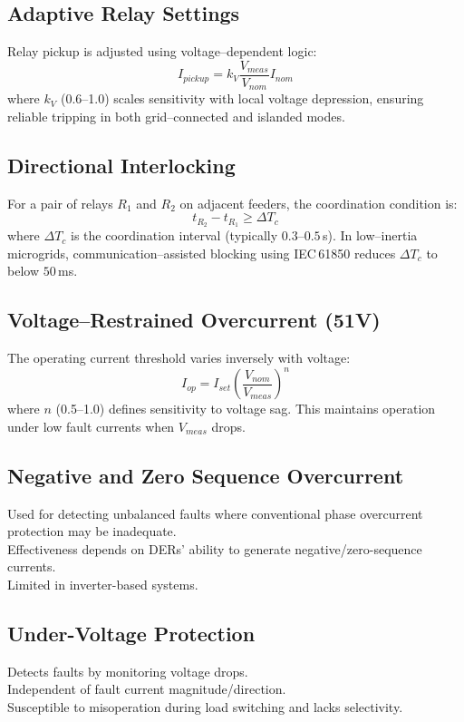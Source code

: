 \subsection{Adaptive Relay Settings}
Relay pickup is adjusted using voltage–dependent logic:
\begin{equation}
I_{pickup} = k_V \frac{V_{meas}}{V_{nom}} I_{nom}
\label{eq:adaptive}
\end{equation}
where $k_V$ (0.6–1.0) scales sensitivity with local voltage depression, ensuring reliable tripping in both grid–connected and islanded modes.

\subsection{Directional Interlocking}
For a pair of relays $R_1$ and $R_2$ on adjacent feeders, the coordination condition is:
\begin{equation}
t_{R_2} - t_{R_1} \ge \Delta T_c
\label{eq:coordination}
\end{equation}
where $\Delta T_c$ is the coordination interval (typically $0.3$–$0.5$\,s).  
In low–inertia microgrids, communication–assisted blocking using IEC\,61850 reduces $\Delta T_c$ to below $50$\,ms.

\subsection{Voltage–Restrained Overcurrent (51V)}
The operating current threshold varies inversely with voltage:
\begin{equation}
I_{op} = I_{set}\left(\frac{V_{nom}}{V_{meas}}\right)^n
\label{eq:51v}
\end{equation}
where $n$ (0.5–1.0) defines sensitivity to voltage sag.  
This maintains operation under low fault currents when $V_{meas}$ drops.



\subsection{Negative and Zero Sequence Overcurrent}
Used for detecting unbalanced faults where conventional phase overcurrent protection may be inadequate.\\
Effectiveness depends on DERs’ ability to generate negative/zero-sequence currents.\\
Limited in inverter-based systems.\\
\subsection{Under-Voltage Protection}
Detects faults by monitoring voltage drops.\\
Independent of fault current magnitude/direction.\\
Susceptible to misoperation during load switching and lacks selectivity.

